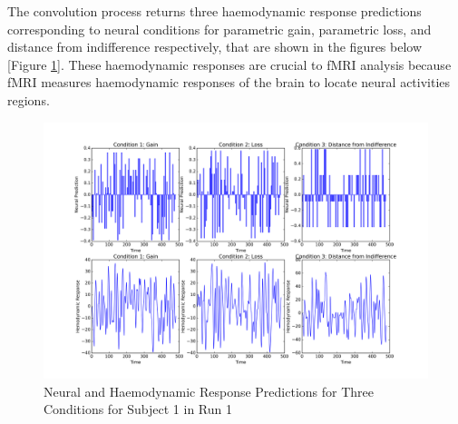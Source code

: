 \par \indent The convolution process returns three haemodynamic response 
predictions corresponding to neural conditions for parametric gain, parametric 
loss, and distance from indifference respectively, that are shown in the 
figures below [Figure \ref{fig:convolution}]. These haemodynamic responses are 
crucial to fMRI analysis because fMRI measures haemodynamic responses of the 
brain to locate neural activities regions. 

\begin{figure}[h!]
\centering
\includegraphics[width=120mm]{images/convolution3cond.png}
\caption{Neural and Haemodynamic Response Predictions for Three Conditions for Subject 1 in Run 1}
\label{fig:convolution}
\end{figure}
